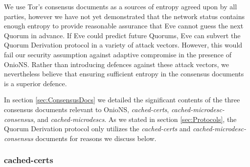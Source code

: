 We use Tor's consensus documents as a sources of entropy agreed upon by all parties, however we have not yet demonstrated that the network status contains enough entropy to provide reasonable assurance that Eve cannot guess the next Quorum in advance. If Eve could predict future Quorums, Eve can subvert the Quorum Derivation protocol in a variety of attack vectors. However, this would fail our security assumption against adaptive compromise in the presence of OnioNS. Rather than introducing defences against these attack vectors, we nevertheless believe that ensuring sufficient entropy in the consensus documents is a superior defence.

%	

In section \ref{sec:ConsensusDocs} we detailed the significant contents of the three consensus documents relevant to OnioNS, \emph{cached-certs}, \emph{cached-microdesc-consensus}, and \emph{cached-microdescs}. As we stated in section \ref{sec:Protocols}, the Quorum Derivation protocol only utilizes the \emph{cached-certs} and \emph{cached-microdesc-consensus} documents for reasons we discuss below.

\subsubsection{cached-certs}

